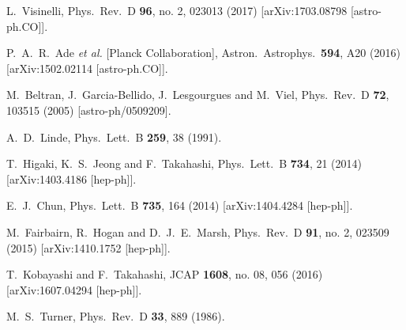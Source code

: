 \documentclass[11pt,nofootinbib]{article}
\numberwithin{equation}{section}
\begin{document}
\begin{thebibliography}{99}
  L.~Visinelli,
  Phys.\ Rev.\ D {\bf 96}, no. 2, 023013 (2017)
  [arXiv:1703.08798 [astro-ph.CO]].
	
  P.~A.~R.~Ade {\it et al.} [Planck Collaboration],
  Astron.\ Astrophys.\  {\bf 594}, A20 (2016)
  [arXiv:1502.02114 [astro-ph.CO]].

  M.~Beltran, J.~Garcia-Bellido, J.~Lesgourgues and M.~Viel,
  Phys.\ Rev.\ D {\bf 72}, 103515 (2005)
  [astro-ph/0509209].

  A.~D.~Linde,
  Phys.\ Lett.\ B {\bf 259}, 38 (1991).

  T.~Higaki, K.~S.~Jeong and F.~Takahashi,
  Phys.\ Lett.\ B {\bf 734}, 21 (2014)
  [arXiv:1403.4186 [hep-ph]].

  E.~J.~Chun,
  Phys.\ Lett.\ B {\bf 735}, 164 (2014)
  [arXiv:1404.4284 [hep-ph]].

  M.~Fairbairn, R.~Hogan and D.~J.~E.~Marsh,
  Phys.\ Rev.\ D {\bf 91}, no. 2, 023509 (2015)
  [arXiv:1410.1752 [hep-ph]].

  T.~Kobayashi and F.~Takahashi,
  JCAP {\bf 1608}, no. 08, 056 (2016)
  [arXiv:1607.04294 [hep-ph]].	
	
  M.~S.~Turner,
  Phys.\ Rev.\ D {\bf 33}, 889 (1986).


\end{thebibliography}
\end{document}
